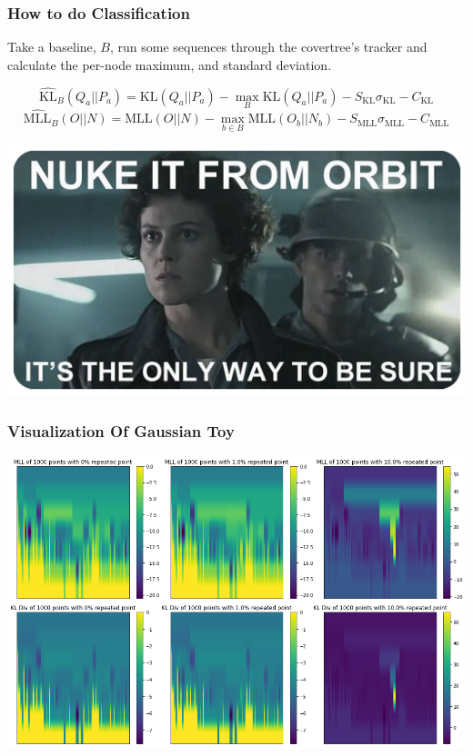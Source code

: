 \documentclass{beamer}
\begin{document}
\begin{frame}
    \frametitle{How to do Classification}
    Take a baseline, $B$, run some sequences through the covertree's tracker and calculate the per-node maximum, and standard deviation.
    
    $$ \widehat{\text{KL}}_B(Q_a|| P_a) = \text{KL}(Q_a|| P_a) - \max_B \text{KL}(Q_a|| P_a) - S_{\text{KL}} \sigma_\text{KL} - C_{\text{KL}}$$
    $$ \widehat{\text{MLL}}_B(O|| N) = \text{MLL}(O|| N)  - \max_{b \in B} \text{MLL}(O_b|| N_b) - S_{\text{MLL}} \sigma_\text{MLL} - C_{\text{MLL}}$$
    \begin{center}
        \includegraphics[scale=0.3]{nuke_it_from_orbit.png}
    \end{center}
\end{frame}

\begin{frame}
    \frametitle{Visualization Of Gaussian Toy}
    \begin{center}
        \includegraphics[scale=0.3]{tree_val_plot_1000_minus_baseline.png}
    \end{center}
\end{frame}
\end{document}
